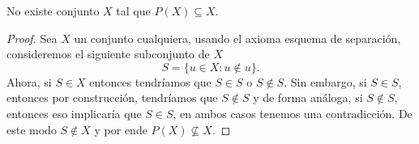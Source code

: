 \begin{exercise}[1.2]
  No existe conjunto $X$ tal que $P(X) \subseteq X$.  
\end{exercise}
\begin{proof}
  Sea $X$ un conjunto cualquiera, usando el axioma esquema de separación, consideremos el siguiente subconjunto de $X$
  \[
    S = \{ u \in X : u \notin u \}.
  \]
  Ahora, si $S \in X$ entonces tendríamos que $S \in S$ o $S \notin S$. Sin embargo, si $S \in S$, entonces por construcción, tendríamos que $S \notin S$ y de forma análoga, si $S \notin S$, entonces eso implicaría que $S \in S$, en ambos casos tenemos una contradicción. De este modo $S \notin X$ y por ende $P(X) \nsubseteq X$.
\end{proof}